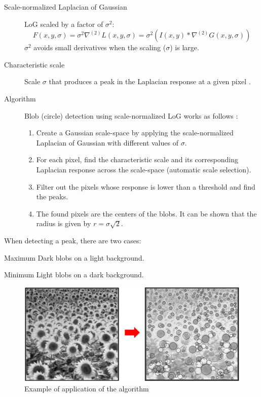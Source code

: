\begin{description}
    \item[Scale-normalized Laplacian of Gaussian] 
        LoG scaled by a factor of $\sigma^2$:
        \[ F(x, y, \sigma) = \sigma^2 \nabla^{(2)} L(x, y, \sigma) = \sigma^2 (I(x, y) * \nabla^{(2)} G(x, y, \sigma)) \]
        $\sigma^2$ avoids small derivatives when the scaling ($\sigma$) is large.

    \item[Characteristic scale] Scale $\sigma$ that produces a peak in the Laplacian response at a given pixel \cite{slides:scale_normalized_log}.
    
    \item[Algorithm] 
        Blob (circle) detection using scale-normalized LoG works as follows \cite{slides:scale_normalized_log}:
        \begin{enumerate}
            \item Create a Gaussian scale-space by applying the scale-normalized Laplacian of Gaussian with different values of $\sigma$.
            \item For each pixel, find the characteristic scale and its corresponding Laplacian response across the scale-space (automatic scale selection).
            \item Filter out the pixels whose response is lower than a threshold and find the peaks.
            \item The found pixels are the centers of the blobs. 
                It can be shown that the radius is given by $r = \sigma\sqrt{2}$.
        \end{enumerate}
\end{description}


When detecting a peak, there are two cases:
\begin{descriptionlist}
    \item[Maximum] Dark blobs on a light background.
    \item[Minimum] Light blobs on a dark background.
\end{descriptionlist}

\begin{figure}[H]
    \centering
    \includegraphics[width=0.6\linewidth]{./img/LOG_blob_detection_example.png}
    \caption{Example of application of the algorithm}
\end{figure}

